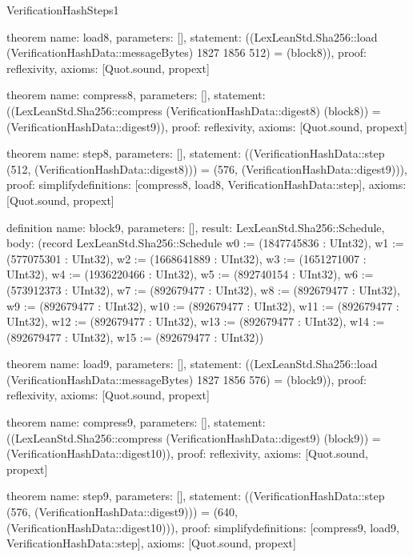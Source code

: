 \begin{lexlean}{VerificationHashSteps1}
\begin{semanticmodule}
theorem{
  name: load8,
  parameters: [],
  statement: ((LexLeanStd.Sha256::load (VerificationHashData::messageBytes) 1827 1856 512) = (block8)),
  proof: reflexivity{},
  axioms: [Quot.sound, propext]
}

theorem{
  name: compress8,
  parameters: [],
  statement: ((LexLeanStd.Sha256::compress (VerificationHashData::digest8) (block8)) = (VerificationHashData::digest9)),
  proof: reflexivity{},
  axioms: [Quot.sound, propext]
}

theorem{
  name: step8,
  parameters: [],
  statement: ((VerificationHashData::step (512, (VerificationHashData::digest8))) = (576, (VerificationHashData::digest9))),
  proof: simplify{definitions: [compress8, load8, VerificationHashData::step]},
  axioms: [Quot.sound, propext]
}

definition{
  name: block9,
  parameters: [],
  result: LexLeanStd.Sha256::Schedule,
  body: (record LexLeanStd.Sha256::Schedule {w0 := (1847745836 : UInt32), w1 := (577075301 : UInt32), w2 := (1668641889 : UInt32), w3 := (1651271007 : UInt32), w4 := (1936220466 : UInt32), w5 := (892740154 : UInt32), w6 := (573912373 : UInt32), w7 := (892679477 : UInt32), w8 := (892679477 : UInt32), w9 := (892679477 : UInt32), w10 := (892679477 : UInt32), w11 := (892679477 : UInt32), w12 := (892679477 : UInt32), w13 := (892679477 : UInt32), w14 := (892679477 : UInt32), w15 := (892679477 : UInt32)})
}

theorem{
  name: load9,
  parameters: [],
  statement: ((LexLeanStd.Sha256::load (VerificationHashData::messageBytes) 1827 1856 576) = (block9)),
  proof: reflexivity{},
  axioms: [Quot.sound, propext]
}

theorem{
  name: compress9,
  parameters: [],
  statement: ((LexLeanStd.Sha256::compress (VerificationHashData::digest9) (block9)) = (VerificationHashData::digest10)),
  proof: reflexivity{},
  axioms: [Quot.sound, propext]
}

theorem{
  name: step9,
  parameters: [],
  statement: ((VerificationHashData::step (576, (VerificationHashData::digest9))) = (640, (VerificationHashData::digest10))),
  proof: simplify{definitions: [compress9, load9, VerificationHashData::step]},
  axioms: [Quot.sound, propext]
}

\end{semanticmodule}
\end{lexlean}
